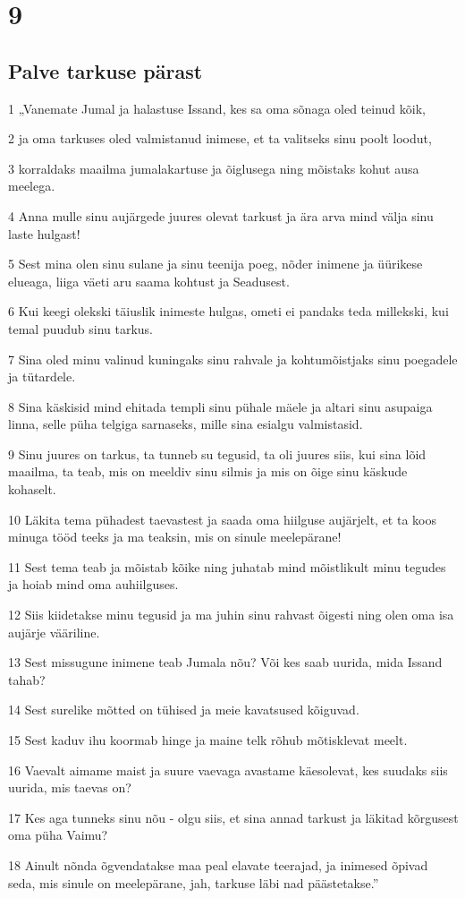 \chapter{9}

\section*{Palve tarkuse pärast}

\par 1 „Vanemate Jumal ja halastuse Issand, kes sa oma sõnaga oled teinud kõik,
\par 2 ja oma tarkuses oled valmistanud inimese, et ta valitseks sinu poolt loodut,
\par 3 korraldaks maailma jumalakartuse ja õiglusega ning mõistaks kohut ausa meelega.
\par 4 Anna mulle sinu aujärgede juures olevat tarkust ja ära arva mind välja sinu laste hulgast!
\par 5 Sest mina olen sinu sulane ja sinu teenija poeg, nõder inimene ja üürikese elueaga, liiga väeti aru saama kohtust ja Seadusest.
\par 6 Kui keegi olekski täiuslik inimeste hulgas, ometi ei pandaks teda millekski, kui temal puudub sinu tarkus.
\par 7 Sina oled minu valinud kuningaks sinu rahvale ja kohtumõistjaks sinu poegadele ja tütardele.
\par 8 Sina käskisid mind ehitada templi sinu pühale mäele ja altari sinu asupaiga linna, selle püha telgiga sarnaseks, mille sina esialgu valmistasid.
\par 9 Sinu juures on tarkus, ta tunneb su tegusid, ta oli juures siis, kui sina lõid maailma, ta teab, mis on meeldiv sinu silmis ja mis on õige sinu käskude kohaselt.
\par 10 Läkita tema pühadest taevastest ja saada oma hiilguse aujärjelt, et ta koos minuga tööd teeks ja ma teaksin, mis on sinule meelepärane!
\par 11 Sest tema teab ja mõistab kõike ning juhatab mind mõistlikult minu tegudes ja hoiab mind oma auhiilguses.
\par 12 Siis kiidetakse minu tegusid ja ma juhin sinu rahvast õigesti ning olen oma isa aujärje vääriline.
\par 13 Sest missugune inimene teab Jumala nõu? Või kes saab uurida, mida Issand tahab?
\par 14 Sest surelike mõtted on tühised ja meie kavatsused kõiguvad.
\par 15 Sest kaduv ihu koormab hinge ja maine telk rõhub mõtisklevat meelt.
\par 16 Vaevalt aimame maist ja suure vaevaga avastame käesolevat, kes suudaks siis uurida, mis taevas on?
\par 17 Kes aga tunneks sinu nõu - olgu siis, et sina annad tarkust ja läkitad kõrgusest oma püha Vaimu?
\par 18 Ainult nõnda õgvendatakse maa peal elavate teerajad, ja inimesed õpivad seda, mis sinule on meelepärane, jah, tarkuse läbi nad päästetakse.” 

